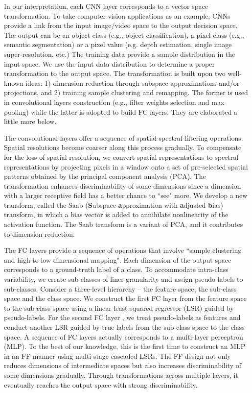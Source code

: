 \documentclass[preprint,12pt]{elsarticle}
\begin{document}
In our interpretation, each CNN layer corresponds to a vector space
transformation. To take computer vision applications as an example, CNNs
provide a link from the input image/video space to the output decision
space. The output can be an object class (e.g., object classification),
a pixel class (e.g., semantic segmentation) or a pixel value (e.g. depth
estimation, single image super-resolution, etc.) The training data
provide a sample distribution in the input space. We use the input data
distribution to determine a proper transformation to the output space.
The transformation is built upon two well-known ideas: 1) dimension
reduction through subspace approximations and/or projections, and 2)
training sample clustering and remapping.  The former is used in
convolutional layers construction (e.g., filter weights selection and
max pooling) while the latter is adopted to build FC layers. They are
elaborated a little more below. 

The convolutional layers offer a sequence of spatial-spectral filtering
operations. Spatial resolutions become coarser along this process
gradually. To compensate for the loss of spatial resolution, we convert
spatial representations to spectral representations by projecting pixels
in a window onto a set of pre-selected spatial patterns obtained by the
principal component analysis (PCA). The transformation enhances
discriminability of some dimensions since a dimension with a larger
receptive field has a better chance to ``see" more. We develop a new
transform, called the Saab ({\bf S}ubspace {\bf a}pproximation with {\bf
a}djusted {\bf b}ias) transform, in which a bias vector is added to
annihilate nonlinearity of the activation function. The Saab transform
is a variant of PCA, and it contributes to dimension reduction. 

The FC layers provide a sequence of operations that involve ``sample
clustering and high-to-low dimensional mapping". Each dimension of the
output space corresponds to a ground-truth label of a class. To
accommodate intra-class variability, we create sub-classes of finer
granularity and assign pseudo labels to sub-classes.  Consider a
three-level hierarchy -- the feature space, the sub-class space and the
class space. We construct the first FC layer from the feature space to
the sub-class space using a linear least-squared regressor (LSR) guided
by pseudo-labels. For the second FC layer , we treat pseudo-labels as
features and conduct another LSR guided by true labels from the
sub-class space to the class space. A sequence of FC layers actually
corresponds to a multi-layer perceptron (MLP). To the best of our
knowledge, this is the first time to construct an MLP in an FF manner
using multi-stage cascaded LSRs.  The FF design not only reduces
dimensions of intermediate spaces but also increases discriminability of
some dimensions gradually. Through transformations across multiple
layers, it eventually reaches the output space with strong
discriminability. 
\end{document}
